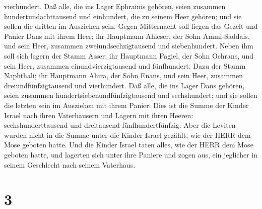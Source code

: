 vierhundert.  Daß alle, die ins Lager Ephraims gehören,
seien zusammen hundertundachttausend und einhundert, die zu seinem Heer
gehören; und sie sollen die dritten im Ausziehen sein. 
Gegen Mitternacht soll liegen das Gezelt und Panier Dans mit ihrem Heer;
ihr Hauptmann Ahieser, der Sohn Ammi-Saddais,  und sein
Heer, zusammen zweiundsechzigtausend und siebenhundert. 
Neben ihm soll sich lagern der Stamm Asser; ihr Hauptmann Pagiel, der
Sohn Ochrans,  und sein Heer, zusammen einundvierzigtausend
und fünfhundert.  Dazu der Stamm Naphthali; ihr Hauptmann
Ahira, der Sohn Enans,  und sein Heer, zusammen
dreiundfünfzigtausend und vierhundert.  Daß alle, die ins
Lager Dans gehören, seien zusammen hundertsiebenundfünfzigtausend und
sechshundert; und sie sollen die letzten sein im Ausziehen mit ihrem
Panier.  Dies ist die Summe der Kinder Israel nach ihren
Vaterhäusern und Lagern mit ihren Heeren: sechshunderttausend und
dreitausend fünfhundertfünfzig.  Aber die Leviten wurden
nicht in die Summe unter die Kinder Israel gezählt, wie der HERR dem
Mose geboten hatte.  Und die Kinder Israel taten alles, wie
der HERR dem Mose geboten hatte, und lagerten sich unter ihre Paniere
und zogen aus, ein jeglicher in seinem Geschlecht nach seinem Vaterhaus.

\hypertarget{section-2}{%
\section{3}\label{section-2}}

